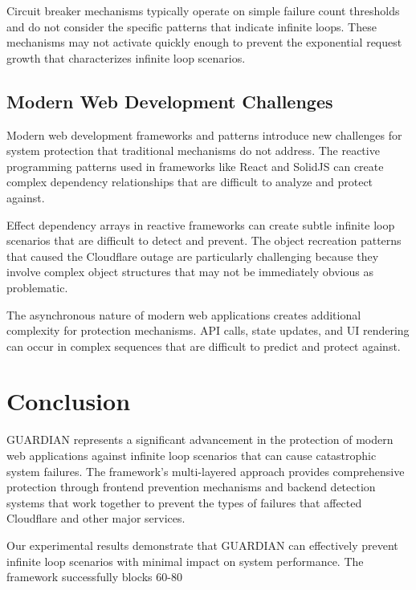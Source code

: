 \documentclass[10pt]{article}
\begin{document}
Circuit breaker mechanisms typically operate on simple failure count thresholds and do not consider the specific patterns that indicate infinite loops. These mechanisms may not activate quickly enough to prevent the exponential request growth that characterizes infinite loop scenarios.

\subsection{Modern Web Development Challenges}

Modern web development frameworks and patterns introduce new challenges for system protection that traditional mechanisms do not address. The reactive programming patterns used in frameworks like React and SolidJS can create complex dependency relationships that are difficult to analyze and protect against.

Effect dependency arrays in reactive frameworks can create subtle infinite loop scenarios that are difficult to detect and prevent. The object recreation patterns that caused the Cloudflare outage are particularly challenging because they involve complex object structures that may not be immediately obvious as problematic.

The asynchronous nature of modern web applications creates additional complexity for protection mechanisms. API calls, state updates, and UI rendering can occur in complex sequences that are difficult to predict and protect against.

\section{Conclusion}

GUARDIAN represents a significant advancement in the protection of modern web applications against infinite loop scenarios that can cause catastrophic system failures. The framework's multi-layered approach provides comprehensive protection through frontend prevention mechanisms and backend detection systems that work together to prevent the types of failures that affected Cloudflare and other major services.

Our experimental results demonstrate that GUARDIAN can effectively prevent infinite loop scenarios with minimal impact on system performance. The framework successfully blocks 60-80%
\end{document}
